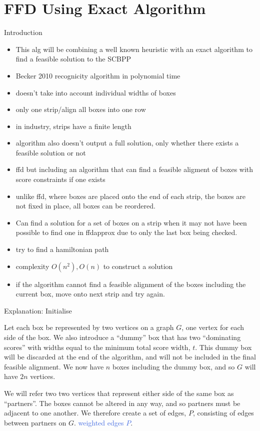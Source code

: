 \documentclass[oribibl]{llncs}
\begin{document}
\section{FFD Using Exact Algorithm}
\label{sec:ffdexact}
Introduction
\begin{itemize}
	\item This alg will be combining a well known heuristic with an exact algorithm to find a feasible solution to the SCBPP
	\item Becker 2010 recognicity algorithm in polynomial time
	\item doesn't take into account individual widths of boxes
	\item only one strip/align all boxes into one row
	\item in industry, strips have a finite length
	\item algorithm also doesn't output a full solution, only whether there exists a feasible solution or not
	\item ffd but including an algorithm that can find a feasible aligment of boxes with score constraints if one exists
	\item unlike ffd, where boxes are placed onto the end of each strip, the boxes are not fixed in place, all boxes can be reordered.
	\item Can find a solution for a set of boxes on a strip when it may not have been possible to find one in ffdapprox due to only the last box being checked.
	\item try to find a hamiltonian path 
	\item complexity $O(n^2), O(n)$ to construct a solution
	\item if the algorithm cannot find a feasible alignment of the boxes including the current box, move onto next strip and try again.
\end{itemize}

Explanation: Initialise

Let each box be represented by two vertices on a graph $G$, one vertex for each side of the box. We also introduce a ``dummy'' box that has two ``dominating scores'' with widths equal to the minimum total score width, $t$. This dummy box will be discarded at the end of the algorithm, and will not be included in the final feasible alignment. We now have $n$ boxes including the dummy box, and so $G$ will have $2n$ vertices.

We will refer two two vertices that represent either side of the same box as ``partners''. The boxes cannot be altered in any way, and so partners must be adjacent to one another. We therefore create a set of edges, $P$, consisting of edges between partners on $G$. \textcolor{RoyalBlue}{weighted edges $P$}.
\end{document}
